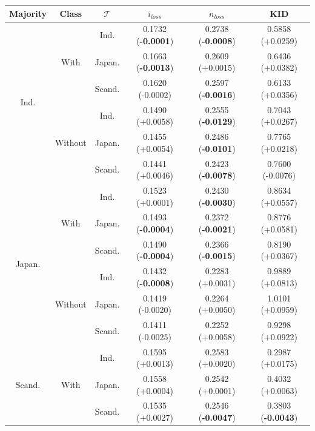 \begin{table}[]
\centering
\begin{tabular}{c|c|c|c|c|c}
    \textbf{Majority} & \textbf{Class} & \textbf{$\mathcal{T}$} & \textbf{$i_{loss}$} & \textbf{$n_{loss}$} & \textbf{KID} \\
    \toprule

\multirow{6}{*}{Ind.} & \multirow{3}{*}{With} & Ind.     & 0.1732 (\textbf{-0.0001})       & 0.2738 (\textbf{-0.0008})       & 0.5858 (+0.0259)    \\
 &  & Japan.   & 0.1663 (\textbf{-0.0013})       & 0.2609 (+0.0015)       & 0.6436 (+0.0382)  \\
 &  & Scand. & 0.1620 (-0.0002)       & 0.2597 (\textbf{-0.0016})       & 0.6133 (+0.0356)  \\
\hhline{~-----}
 & \multirow{3}{*}{Without} & Ind.     & 0.1490 (+0.0058)       & 0.2555 (\textbf{-0.0129})       & 0.7043 (+0.0267)   \\
 &  & Japan.   & 0.1455 (+0.0054)       & 0.2486 (\textbf{-0.0101})       & 0.7765 (+0.0218)  \\
 &  & Scand. & 0.1441 (+0.0046)       & 0.2423 (\textbf{-0.0078})       & 0.7600 (-0.0076)  \\
\midrule
\multirow{6}{*}{Japan.} & \multirow{3}{*}{With} & Ind.     & 0.1523 (+0.0001)       & 0.2430 (\textbf{-0.0030})       & 0.8634 (+0.0557)   \\
 &  & Japan.   & 0.1493 (\textbf{-0.0004})       & 0.2372 (\textbf{-0.0021})       & 0.8776 (+0.0581)   \\
 &  & Scand. & 0.1490 (\textbf{-0.0004})       & 0.2366 (\textbf{-0.0015})       & 0.8190 (+0.0367)  \\
\hhline{~-----}
 & \multirow{3}{*}{Without} & Ind.     & 0.1432 (\textbf{-0.0008})       & 0.2283 (+0.0031)       & 0.9889 (+0.0813)     \\
 &  & Japan.   & 0.1419 (-0.0020)       & 0.2264 (+0.0050)       & 1.0101 (+0.0959)  \\
 &  & Scand. & 0.1411 (-0.0025)       & 0.2252 (+0.0058)       & 0.9298 (+0.0922)  \\
\midrule
\multirow{6}{*}{Scand.} & \multirow{3}{*}{With} & Ind.     & 0.1595 (+0.0013)       & 0.2583 (+0.0020)       & 0.2987 (+0.0175)   \\
 &  & Japan.   & 0.1558 (+0.0004)       & 0.2542 (+0.0001)       & 0.4032 (+0.0063)   \\
 &  & Scand. & 0.1535 (+0.0027)       & 0.2546 (\textbf{-0.0047})       & 0.3803 (\textbf{-0.0043}) \\

\end{tabular}
\end{table}

